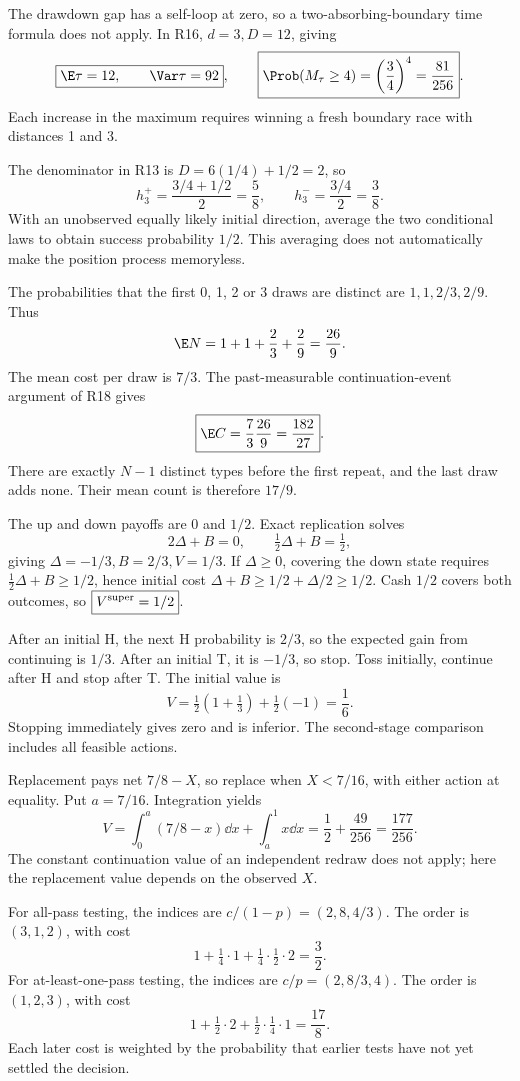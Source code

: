 The drawdown gap has a self-loop at zero, so a two-absorbing-boundary time formula does not apply. In R16, $d=3,D=12$, giving
\[
 \boxed{\E\tau=12,\qquad\Var\tau=92},\qquad
 \boxed{\Prob(M_\tau\ge4)=\left(\frac34\right)^4=\frac{81}{256}}.
\]
Each increase in the maximum requires winning a fresh boundary race with distances 1 and 3.

The denominator in R13 is $D=6(1/4)+1/2=2$, so
\[
 \boxed{h_3^+=\frac{3/4+1/2}{2}=\frac58},\qquad
 \boxed{h_3^-=\frac{3/4}{2}=\frac38}.
\]
With an unobserved equally likely initial direction, average the two conditional laws to obtain success probability $\boxed{1/2}$. This averaging does not automatically make the position process memoryless.

The probabilities that the first 0, 1, 2 or 3 draws are distinct are $1,1,2/3,2/9$. Thus
\[
 \E N=1+1+\frac23+\frac29=\frac{26}{9}.
\]
The mean cost per draw is $7/3$. The past-measurable continuation-event argument of R18 gives
\[
 \boxed{\E C=\frac73\frac{26}{9}=\frac{182}{27}}.
\]
There are exactly $N-1$ distinct types before the first repeat, and the last draw adds none. Their mean count is therefore $\boxed{17/9}$.

The up and down payoffs are 0 and $1/2$. Exact replication solves
\[
 2\Delta+B=0,\qquad\tfrac12\Delta+B=\tfrac12,
\]
giving $\boxed{\Delta=-1/3,B=2/3,V=1/3}$. If $\Delta\ge0$, covering the down state requires $\tfrac12\Delta+B\ge1/2$, hence initial cost $\Delta+B\ge1/2+\Delta/2\ge1/2$. Cash $1/2$ covers both outcomes, so $\boxed{V^{\rm super}=1/2}$.

After an initial H, the next H probability is $2/3$, so the expected gain from continuing is $1/3$. After an initial T, it is $-1/3$, so stop. Toss initially, continue after H and stop after T. The initial value is
\[
 \boxed{V=\tfrac12(1+\tfrac13)+\tfrac12(-1)=\frac16}.
\]
Stopping immediately gives zero and is inferior. The second-stage comparison includes all feasible actions.

Replacement pays net $7/8-X$, so replace when $X<7/16$, with either action at equality. Put $a=7/16$. Integration yields
\[
 \boxed{V=\int_0^a(7/8-x)\dd x+\int_a^1x\dd x
 =\frac12+\frac{49}{256}=\frac{177}{256}}.
\]
The constant continuation value of an independent redraw does not apply; here the replacement value depends on the observed $X$.

For all-pass testing, the indices are $c/(1-p)=(2,8,4/3)$. The order is $(3,1,2)$, with cost
\[
 \boxed{1+\tfrac14\cdot1+\tfrac14\cdot\tfrac12\cdot2=\frac32}.
\]
For at-least-one-pass testing, the indices are $c/p=(2,8/3,4)$. The order is $(1,2,3)$, with cost
\[
 \boxed{1+\tfrac12\cdot2+\tfrac12\cdot\tfrac14\cdot1=\frac{17}{8}}.
\]
Each later cost is weighted by the probability that earlier tests have not yet settled the decision.


